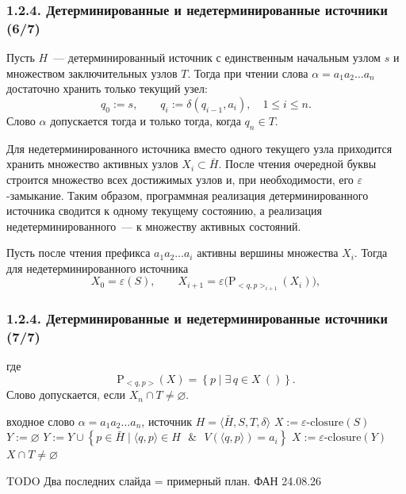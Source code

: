 \documentclass[mathserif,12pt,aspectratio=169]{beamer}
\let\emptyset\varnothing
\def\Set#1#2{\left\{ #1 \mid #2 \right\}}
\def\Assign{\operatorname{:=}}
\def\E#1#2{\exists\,#1\ \left(#2\right)}
\def\And{\operatorname{\,\&\,}}
\let\le\leqslant
\def\TODO#1{{\color{gray} TODO {#1}}}
\begin{document}
\begin{frame}
\frametitle{1.2.4. Детерминированные и недетерминированные источники (6/7)}

\begin{example}
Пусть $H$~--- детерминированный источник с единственным начальным узлом $s$
и множеством заключительных узлов $T$.
Тогда при чтении слова $\alpha=a_1a_2\dots a_n$ достаточно хранить только
текущий узел:
\[
q_0\Assign s,\qquad q_i\Assign \delta(q_{i-1},a_i),\quad 1\le i\le n.
\]
Слово $\alpha$ допускается тогда и только тогда, когда $q_n\in T$.
\end{example}

\begin{remark}
Для недетерминированного источника вместо одного текущего узла приходится
хранить множество активных узлов $X_i\subset\bar H$.
После чтения очередной буквы строится множество всех достижимых узлов
и, при необходимости, его $\varepsilon$-замыкание.
Таким образом, программная реализация детерминированного источника сводится
к одному текущему состоянию, а реализация недетерминированного~--- к
множеству активных состояний.
\end{remark}

\begin{example}
Пусть после чтения префикса $a_1a_2\dots a_i$ активны вершины множества $X_i$.
Тогда для недетерминированного источника
\[
X_0=\varepsilon(S),\qquad
X_{i+1}=\varepsilon\bigl(\mathrm{P}_{<q,p>_{i+1}}(X_i)\bigr),
\]
\end{example}
\end{frame}


\begin{frame}
\frametitle{1.2.4. Детерминированные и недетерминированные источники (7/7)}


где
\[
\mathrm{P}_{<q,p>}(X)=\Set{p}{\E{q\in X}{}}.
\]
Слово допускается, если $X_n\cap T\neq\emptyset$.

\medskip
\begin{algorithmic}
\REQUIRE входное слово $\alpha=a_1a_2\dots a_n$, источник $H=\langle \bar H,S,T,\delta\rangle$
\STATE $X\Assign\varepsilon\text{-closure}(S)$
  \STATE $Y\Assign\emptyset$
    \STATE $Y\Assign Y\cup\Set{p\in \bar H}{\langle q,p\rangle\in H\ \And\ V(\langle q,p\rangle)=a_i}$
  \ENDFOR
  \STATE $X\Assign\varepsilon\text{-closure}(Y)$
\ENDFOR
{} $X\cap T\neq\emptyset$
\end{algorithmic}

\TODO{Два последних слайда = примерный план. ФАН 24.08.26}
\end{frame}
\end{document}
